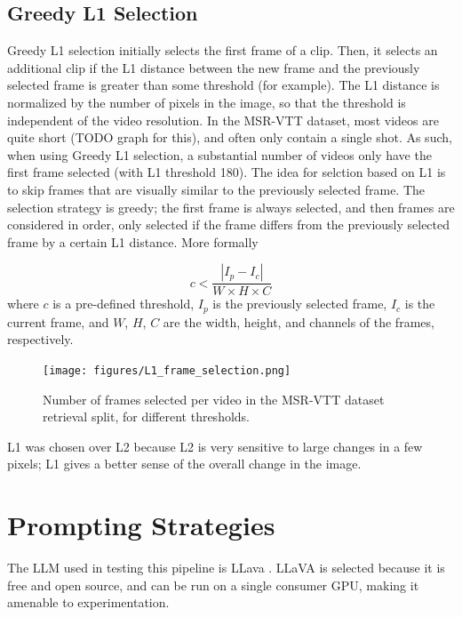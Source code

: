 \documentclass{article}
\begin{document}
\subsection{Greedy L1 Selection}
Greedy L1 selection initially selects the first frame of a clip. Then, it selects an additional clip if the L1 distance between the new frame and the previously selected frame is greater than some threshold (for example).
The L1 distance is normalized by the number of pixels in the image, so that the threshold is independent of the video resolution.
In the MSR-VTT dataset, most videos are quite short (TODO graph for this), and often only contain a single shot.
As such, when using Greedy L1 selection, a substantial number of videos only have the first frame selected (with L1 threshold 180).
The idea for selction based on L1 is to skip frames that are visually similar to the previously selected frame.
The selection strategy is greedy; the first frame is always selected, and then frames are considered in order, only selected if the frame differs from the previously selected frame by a certain L1 distance.
More formally

\begin{equation}
      c < \frac{|I_{p} - I_{c}|}{W \times H \times C}
\end{equation}
where $c$ is a pre-defined threshold, $I_{p}$ is the previously selected frame, $I_{c}$ is the current frame, and $W$, $H$, $C$ are the width, height, and channels of the frames, respectively.

\begin{figure}
      \centering
      \texttt{[image: figures/L1\_frame\_selection.png]}
      \caption{Number of frames selected per video in the MSR-VTT dataset retrieval split, for different thresholds.}
      \label{fig:optical_flow}
\end{figure}

L1 was chosen over L2 because L2 is very sensitive to large changes in a few pixels; L1 gives a better sense of the overall change in the image.

\section{Prompting Strategies}

The LLM used in testing this pipeline is LLava \cite{llava}.
LLaVA is selected because it is free and open source, and can be run on a single consumer GPU, making it amenable to experimentation.
\end{document}
